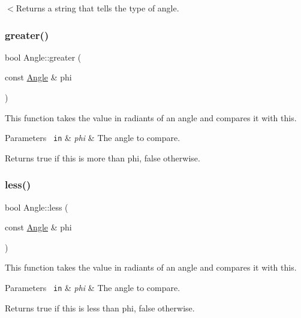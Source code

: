 $<$Returns a string that tells the type of angle. \mbox{\label{class_angle_a2ead65678819acef29cc4c7f2400f631}} 
\subsubsection{\texorpdfstring{greater()}{greater()}}
{\footnotesize\ttfamily bool Angle\+::greater (\begin{DoxyParamCaption}\item[{const \mbox{\hyperlink{class_angle}{Angle}} \&}]{phi }\end{DoxyParamCaption})\hspace{0.3cm}{\ttfamily [inline]}}

This function takes the value in radiants of an angle and compares it with this. 
\begin{DoxyParams}[1]{Parameters}
\mbox{\texttt{ in}}  & {\em phi} & The angle to compare. \\
\hline
\end{DoxyParams}
\begin{DoxyReturn}{Returns}
{\ttfamily true} if this is more than phi, {\ttfamily false} otherwise. 
\end{DoxyReturn}
\mbox{\label{class_angle_a4e25c0ed5a92eb8af995a038c70f4e26}} 
\subsubsection{\texorpdfstring{less()}{less()}}
{\footnotesize\ttfamily bool Angle\+::less (\begin{DoxyParamCaption}\item[{const \mbox{\hyperlink{class_angle}{Angle}} \&}]{phi }\end{DoxyParamCaption})\hspace{0.3cm}{\ttfamily [inline]}}

This function takes the value in radiants of an angle and compares it with this. 
\begin{DoxyParams}[1]{Parameters}
\mbox{\texttt{ in}}  & {\em phi} & The angle to compare. \\
\hline
\end{DoxyParams}
\begin{DoxyReturn}{Returns}
{\ttfamily true} if this is less than phi, {\ttfamily false} otherwise. 
\end{DoxyReturn}
\mbox{\label{class_angle_aa1c4b848f4ac7ece9d2fa010abc91511}} 
